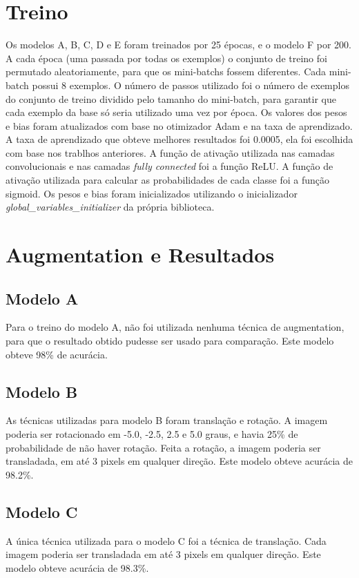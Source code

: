 \documentclass[conference]{IEEEtran}
\begin{document}
\section{Treino}
Os modelos A, B, C, D e E foram treinados por 25 épocas, e o modelo F por 200. A cada época (uma passada por todas os exemplos) o conjunto de treino foi permutado aleatoriamente, para que os mini-batchs fossem diferentes. Cada mini-batch possui 8 exemplos. O número de passos utilizado foi o número de exemplos do conjunto de treino dividido pelo tamanho do mini-batch, para garantir que cada exemplo da base só seria utilizado uma vez por época. Os valores dos pesos e bias foram atualizados com base no otimizador Adam e na taxa de aprendizado. A taxa de aprendizado que obteve melhores resultados foi 0.0005, ela foi escolhida com base nos trablhos anteriores. A função de ativação utilizada nas camadas convolucionais e nas camadas \textit{fully connected} foi a função ReLU. A função de ativação utilizada para calcular as probabilidades de cada classe foi a função sigmoid. Os pesos e bias foram inicializados utilizando o inicializador \textit{global\_variables\_initializer} da própria biblioteca.

\section{Augmentation e Resultados}

\subsection{Modelo A}
	Para o treino do modelo A, não foi utilizada nenhuma técnica de augmentation, para que o resultado obtido pudesse ser usado para comparação. Este modelo obteve 98\% de acurácia.

\subsection{Modelo B}
	As técnicas utilizadas para modelo B foram translação e rotação. A imagem poderia ser rotacionado em -5.0, -2.5, 2.5 e 5.0 graus, e havia 25\% de probabilidade de não haver rotação. Feita a rotação, a imagem poderia ser transladada, em até 3 pixels em qualquer direção. Este modelo obteve acurácia de 98.2\%.

\subsection{Modelo C}
	A única técnica utilizada para o modelo C foi a técnica de translação. Cada imagem poderia ser transladada em até 3 pixels em qualquer direção. Este modelo obteve acurácia de 98.3\%.
\end{document}
